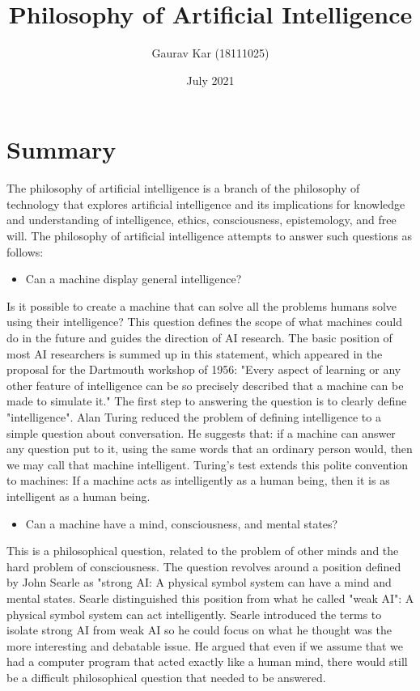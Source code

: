 \documentclass{article}
\title{Philosophy of Artificial Intelligence}
\author{Gaurav Kar (18111025)}
\date{July 2021}
\begin{document}
\maketitle

\section{Summary}
The philosophy of artificial intelligence is a branch of the philosophy of technology that explores artificial intelligence and its implications for knowledge and understanding of intelligence, ethics, consciousness, epistemology, and free will. The philosophy of artificial intelligence attempts to answer such questions as follows:
\begin{itemize}
    \item Can a machine display general intelligence?
\end{itemize} 
Is it possible to create a machine that can solve all the problems humans solve using their intelligence? This question defines the scope of what machines could do in the future and guides the direction of AI research. The basic position of most AI researchers is summed up in this statement, which appeared in the proposal for the Dartmouth workshop of 1956: "Every aspect of learning or any other feature of intelligence can be so precisely described that a machine can be made to simulate it."
The first step to answering the question is to clearly define "intelligence". Alan Turing reduced the problem of defining intelligence to a simple question about conversation. He suggests that: if a machine can answer any question put to it, using the same words that an ordinary person would, then we may call that machine intelligent. Turing's test extends this polite convention to machines: If a machine acts as intelligently as a human being, then it is as intelligent as a human being.
\begin{itemize}
    \item Can a machine have a mind, consciousness, and mental states?
\end{itemize}
This is a philosophical question, related to the problem of other minds and the hard problem of consciousness. The question revolves around a position defined by John Searle as "strong AI: A physical symbol system can have a mind and mental states. Searle distinguished this position from what he called "weak AI": A physical symbol system can act intelligently. Searle introduced the terms to isolate strong AI from weak AI so he could focus on what he thought was the more interesting and debatable issue. He argued that even if we assume that we had a computer program that acted exactly like a human mind, there would still be a difficult philosophical question that needed to be answered.
\end{document}
